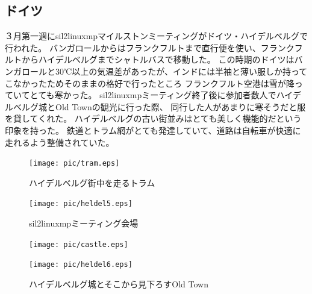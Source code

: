 \subsection{ドイツ}
３月第一週に\acrshort{sil2linuxmp}マイルストンミーティングがドイツ・ハイデルベルグで行われた。
バンガロールからはフランクフルトまで直行便を使い、フランクフルトからハイデルベルグまでシャトルバスで移動した。
この時期のドイツはバンガロールと30℃以上の気温差があったが、インドには半袖と薄い服しか持ってこなかったためそのままの格好で行ったところ
フランクフルト空港は雪が降っていてとても寒かった。
\acrshort{sil2linuxmp}ミーティング終了後に参加者数人でハイデルベルグ城とOld Townの観光に行った際、
同行した人があまりに寒そうだと服を貸してくれた。
ハイデルベルグの古い街並みはとても美しく機能的だという印象を持った。
鉄道とトラム網がとても発達していて、道路は自転車が快適に走れるよう整備されていた。
\begin{figure}[H]
  \begin{minipage}{0.5\hsize}
  \begin{center}
    \texttt{[image: pic/tram.eps]}
  \end{center}
  \caption{ハイデルベルグ街中を走るトラム}
  \end{minipage}
  \begin{minipage}{0.5\hsize}
  \begin{center}
    \texttt{[image: pic/heldel5.eps]}
  \end{center}
  \caption{\acrshort{sil2linuxmp}ミーティング会場}
  \end{minipage}
\end{figure}
\begin{figure}[H]
  \begin{minipage}{0.5\hsize}
  \begin{center}
    \texttt{[image: pic/castle.eps]}
  \end{center}
  \end{minipage}
  \begin{minipage}{0.5\hsize}
  \begin{center}
    \texttt{[image: pic/heldel6.eps]}
  \end{center}
  \end{minipage}
  \caption{ハイデルベルグ城とそこから見下ろすOld Town}
\end{figure}
